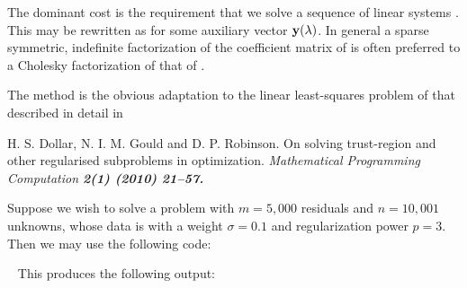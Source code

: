 \documentclass{galahad}
\begin{document}
The dominant cost is the requirement that we solve a sequence of linear systems
. This may be rewritten as
for some auxiliary vector ${\mathbf{y}}(\lambda)$.
In general a sparse symmetric, indefinite factorization of the
coefficient matrix of  is
often preferred to a Cholesky factorization of that of .

\galreference
The method is the obvious adaptation to the linear least-squares
problem of that described in detail in
\vspace*{1mm}

\noindent
H. S. Dollar, N. I. M. Gould and D. P. Robinson.
On solving trust-region and other regularised subproblems in optimization.
\em Mathematical Programming Computation \bf 2(1) \rm (2010) 21--57.


\galexample
Suppose we wish to solve a problem with $m = 5,000$ residuals
and $n = 10,001$ unknowns, whose data is
with a weight $\sigma = 0.1$ and regularization power $p = 3$.
Then we may use the following code:

{\tt \small
\VerbatimInput{\packageexample}
}
\noindent
This produces the following output:
{\tt \small
\VerbatimInput{\packageresults}
}
\end{document}
